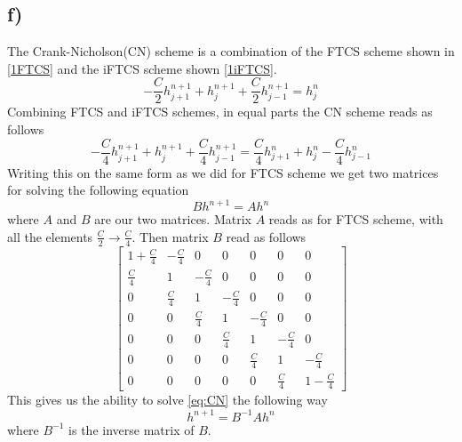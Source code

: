\documentclass[10pt, a4paper]{amsart}
\begin{document}
\subsection{f)}
The Crank-Nicholson(CN) scheme is a combination of the FTCS scheme shown in \ref{1FTCS} and the iFTCS scheme shown \ref{1iFTCS}.
\begin{equation}\label{1iFTCS}
	-\frac{C}{2}h_{j+1}^{n+1} + h_j^{n+1} +\frac{C}{2}h_{j-1}^{n+1} = h_j^n
\end{equation}
Combining FTCS and iFTCS schemes, in equal parts the CN scheme reads as follows 
\begin{equation}
	- 	\frac{C}{4}h_{j+1}^{n+1} + h_j^{n+1} + 	\frac{C}{4}h_{j-1}^{n+1} = 	\frac{C}{4}h_{j+1}^n + h_j^n - 	\frac{C}{4}h_{j-1}^n
\end{equation}
Writing this on the same form as we did for FTCS scheme we get two matrices for solving the following equation
\begin{equation}\label{eq:CN}
	Bh^{n+1} = Ah^n
\end{equation}
where $A$ and $B$ are our two matrices. Matrix $A$ reads as for FTCS scheme, with all the elements $	\frac{C}{2} \rightarrow 	\frac{C}{4}$. Then matrix $B$ read as follows 
 \begin{equation}
 	\begin{bmatrix}
 		1 + \frac{C}{4} & -\frac{C}{4} & 0 & 0 & 0 & 0 & 0\\
 		 \frac{C}{4} & 1 & -\frac{C}{4} & 0 & 0 & 0 & 0\\
 		0 &  \frac{C}{4} & 1 & -\frac{C}{4} & 0 & 0 & 0\\
 		0 & 0 &  \frac{C}{4} & 1 & -\frac{C}{4} & 0 & 0\\
 		0 & 0 & 0 &  \frac{C}{4} & 1 & -\frac{C}{4} & 0\\
 		0 & 0 & 0 & 0 &  \frac{C}{4} & 1 & -\frac{C}{4}\\
 		0 & 0 & 0 & 0 & 0 &  \frac{C}{4} & 1 - \frac{C}{4}
 	\end{bmatrix}
 \end{equation}
This gives us the ability to solve \ref{eq:CN} the following way 
\begin{equation}
	h^{n+1} = B^{-1}Ah^n
\end{equation}
where $B^{-1}$ is the inverse matrix of $B$. 
\end{document}
